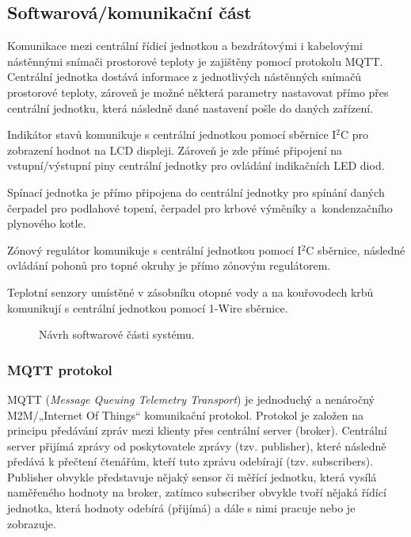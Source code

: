 \subsection{Softwarová/komunikační část}

Komunikace mezi centrální řídicí jednotkou a bezdrátovými i kabelovými nástěnnými snímači prostorové teploty je zajištěny pomocí protokolu MQTT. Centrální jednotka dostává informace z jednotlivých nástěnných snímačů prostorové teploty, zároveň je možné některá parametry nastavovat přímo přes centrální jednotku, která následně dané nastavení pošle do daných zařízení.

Indikátor stavů komunikuje s centrální jednotkou pomocí sběrnice I$^2$C pro zobrazení hodnot na LCD displeji. Zároveň je zde přímé připojení na vstupní/výstupní piny centrální jednotky pro ovládání indikačních LED diod.

Spínací jednotka je přímo připojena do centrální jednotky pro spínání daných čerpadel pro podlahové topení, čerpadel pro krbové výměníky a~kondenzačního plynového kotle.

Zónový regulátor komunikuje s centrální jednotkou pomocí I$^2$C sběrnice, následné ovládání pohonů pro topné okruhy je přímo zónovým regulátorem.

Teplotní senzory umístěné v zásobníku otopné vody a na kouřovodech krbů komunikují s centrální jednotkou pomocí 1-Wire sběrnice.

\begin{figure}[H]
    \centering
    \def\svgwidth{\columnwidth}
    
    \caption{Návrh softwarové části systému.}
    \label{fig:navrh-softwarove-casti}
\end{figure}

\subsubsection{MQTT protokol}

MQTT (\textit{Message Queuing Telemetry Transport}) je jednoduchý a nenáročný M2M/„Internet Of Things“ komunikační protokol. Protokol je založen na principu předávání zpráv mezi klienty přes centrální server (broker). Centrální server přijímá zprávy od poskytovatele zprávy (tzv. publisher), které následně předává k přečtení čtenářům, kteří tuto zprávu odebírají (tzv. subscribers). Publisher obvykle představuje nějaký sensor či měřící jednotku, která vysílá naměřeného hodnoty na broker, zatímco subscriber obvykle tvoří nějaká řídící jednotka, která hodnoty odebírá (přijímá) a dále s nimi pracuje  nebo je zobrazuje.

